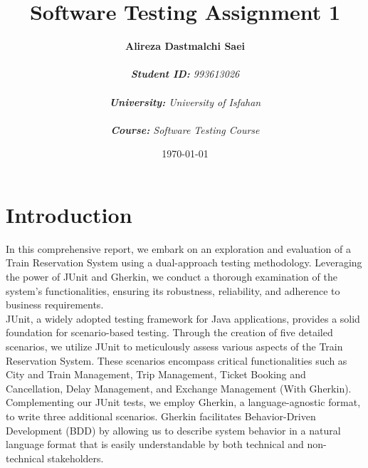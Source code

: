 \documentclass{article}
\title{\textbf{Software Testing Assignment 1}}
\author{\textbf{Alireza Dastmalchi Saei}\\\\
    \textit{\textbf{Student ID:} 993613026}\\\\
    \textit{\textbf{University:} University of Isfahan}\\\\
    \textit{\textbf{Course:} Software Testing Course}\\}
\date{\today}
\begin{document}
\posttitle{\end{center}\vspace{3\baselineskip}}


\maketitle

\pagebreak

\section{Introduction}


In this comprehensive report, we embark on an exploration and evaluation of a Train Reservation System using a dual-approach testing methodology. Leveraging the power of JUnit and Gherkin, we conduct a thorough examination of the system's functionalities, ensuring its robustness, reliability, and adherence to business requirements.\\

JUnit, a widely adopted testing framework for Java applications, provides a solid foundation for scenario-based testing. Through the creation of five detailed scenarios, we utilize JUnit to meticulously assess various aspects of the Train Reservation System. These scenarios encompass critical functionalities such as City and Train Management, Trip Management, Ticket Booking and Cancellation, Delay Management, and Exchange Management (With Gherkin).\\

Complementing our JUnit tests, we employ Gherkin, a language-agnostic format, to write three additional scenarios. Gherkin facilitates Behavior-Driven Development (BDD) by allowing us to describe system behavior in a natural language format that is easily understandable by both technical and non-technical stakeholders.\\
\end{document}
